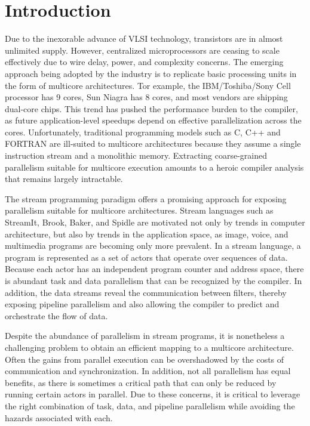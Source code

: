 \section{Introduction}


Due to the inexorable advance of VLSI technology, transistors are in
almost unlimited supply.  However, centralized microprocessors are
ceasing to scale effectively due to wire delay, power, and complexity
concerns.  The emerging approach being adopted by the industry is to
replicate basic processing units in the form of multicore
architectures.  Tor example, the IBM/Toshiba/Sony Cell processor has 9
cores\cite{}, Sun Niagra has 8 cores\cite{}, and most vendors are
shipping dual-core chips.  This trend has pushed the performance
burden to the compiler, as future application-level speedups depend on
effective parallelization across the cores.  Unfortunately,
traditional programming models such as C, C++ and FORTRAN are
ill-suited to multicore architectures because they assume a single
instruction stream and a monolithic memory.  Extracting coarse-grained
parallelism suitable for multicore execution amounts to a heroic
compiler analysis that remains largely intractable.

The stream programming paradigm offers a promising approach for
exposing parallelism suitable for multicore architectures.  Stream
languages such as StreamIt\cite{}, Brook\cite{}, Baker\cite{}, and
Spidle\cite{} are motivated not only by trends in computer
architecture, but also by trends in the application space, as image,
voice, and multimedia programs are becoming only more prevalent.  In a
stream language, a program is represented as a set of actors that
operate over sequences of data.  Because each actor has an independent
program counter and address space, there is abundant task and data
parallelism that can be recognized by the compiler.  In addition, the
data streams reveal the communication between filters, thereby
exposing pipeline parallelism and also allowing the compiler to
predict and orchestrate the flow of data.

Despite the abundance of parallelism in stream programs, it is
nonetheless a challenging problem to obtain an efficient mapping to a
multicore architecture.  Often the gains from parallel execution can
be overshadowed by the costs of communication and synchronization.  In
addition, not all parallelism has equal benefits, as there is
sometimes a critical path that can only be reduced by running certain
actors in parallel.  Due to these concerns, it is critical to leverage
the right combination of task, data, and pipeline parallelism while
avoiding the hazards associated with each.

